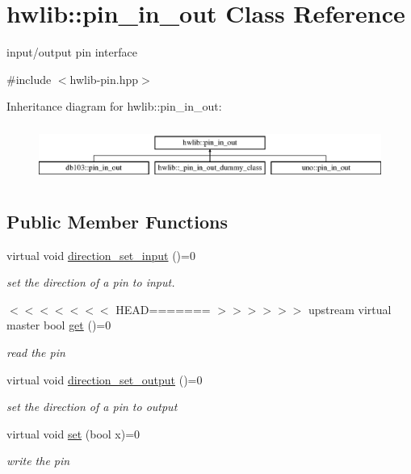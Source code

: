 \hypertarget{classhwlib_1_1pin__in__out}{}\section{hwlib\+:\+:pin\+\_\+in\+\_\+out Class Reference}
\label{classhwlib_1_1pin__in__out}


input/output pin interface  




{\ttfamily \#include $<$hwlib-\/pin.\+hpp$>$}

Inheritance diagram for hwlib\+:\+:pin\+\_\+in\+\_\+out\+:\begin{figure}[H]
\begin{center}
\leavevmode
\includegraphics[height=1.848185cm]{classhwlib_1_1pin__in__out}
\end{center}
\end{figure}
\subsection*{Public Member Functions}
\begin{DoxyCompactItemize}
\item 
virtual void \hyperlink{classhwlib_1_1pin__in__out_a54ce1a5086d3c9e7b868511b1d46acd0}{direction\+\_\+set\+\_\+input} ()=0
\begin{DoxyCompactList}\small\item\em set the direction of a pin to input. \end{DoxyCompactList}\item 
$<$$<$$<$$<$$<$$<$$<$ H\+E\+AD======= $>$$>$$>$$>$$>$$>$ upstream virtual master bool \hyperlink{classhwlib_1_1pin__in__out_a09d4cb593943a17613963c7d99ba2774}{get} ()=0
\begin{DoxyCompactList}\small\item\em read the pin \end{DoxyCompactList}\item 
virtual void \hyperlink{classhwlib_1_1pin__in__out_ad08a5f5e9a4c3aadaa7c665b98f2418e}{direction\+\_\+set\+\_\+output} ()=0
\begin{DoxyCompactList}\small\item\em set the direction of a pin to output \end{DoxyCompactList}\item 
virtual void \hyperlink{classhwlib_1_1pin__in__out_a198c4d27a9783f4c17e8f5dfd9aca6a9}{set} (bool x)=0
\begin{DoxyCompactList}\small\item\em write the pin \end{DoxyCompactList}\end{DoxyCompactItemize}


